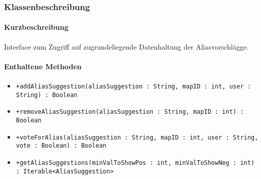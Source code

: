 \subsubsection*{Klassenbeschreibung}%
\paragraph*{Kurzbeschreibung}
Interface zum Zugriff auf zugrundeliegende Datenhaltung der Aliasvorschlägge.
\paragraph*{Enthaltene Methoden}
\begin{itemize}
    \item \texttt{+addAliasSuggestion(aliasSuggestion : String, mapID : int, user : String) : Boolean}
    \item \texttt{+removeAliasSuggestion(aliasSuggestion : String, mapID : int) : Boolean} 
    \item \texttt{+voteForAlias(aliasSuggestion : String, mapID : int, user : String, vote : Boolean) : Boolean}
    \item \texttt{+getAliasSuggestions(minValToShowPos : int, minValToShowNeg : int) : Iterable<AliasSuggestion>}
\end{itemize}
